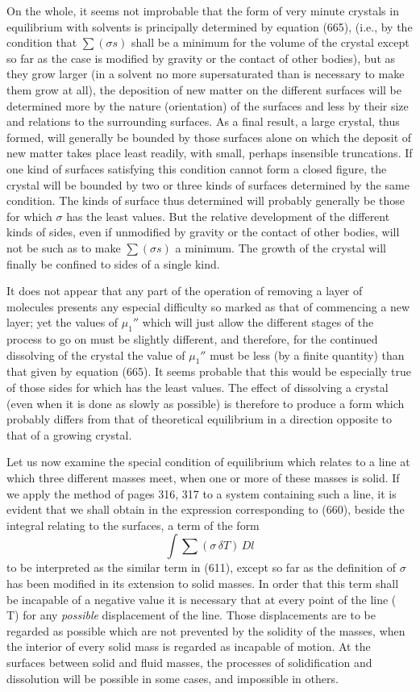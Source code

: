 \documentclass[12pt]{article}
\newcommand{\dd}{\delta}
\begin{document}
{On the whole, it seems not improbable that the form of very minute crystals in equilibrium with solvents is principally determined by equation (665), (i.e., by the condition that $\sum(\sigma s)$ shall be a minimum for the volume of the crystal except so far as the case is modified by gravity or the contact of other bodies), but as they grow larger (in a solvent no more supersaturated than is necessary to make them grow at all), the deposition of new matter on the different surfaces will be determined more by the nature (orientation) of the surfaces and less by their size and relations to the surrounding surfaces.  As a final result, a large crystal, thus formed, will generally be bounded by those surfaces alone on which the deposit of new matter takes place least readily, with small, perhaps insensible truncations. If one kind of surfaces satisfying this condition cannot form a closed figure, the crystal will be bounded by two or three kinds of surfaces determined by the same condition. The kinds of surface thus determined will probably generally be those for which $\sigma$ has the least values. But the relative development of the different kinds of sides, even if unmodified by gravity or the contact of other bodies, will not be such as to make $\sum(\sigma s)$ a minimum. The growth of the crystal will finally be confined to sides of a single kind.\par
It does not appear that any part of the operation of removing a layer of molecules presents any especial difficulty so marked as that of commencing a new layer; yet the values of $\mu_1''$ which will just allow the different stages of the process to go on must be slightly different, and therefore, for the continued dissolving of the crystal the value of $\mu_1''$ must be less (by a finite quantity) than that given by equation (665). It seems probable that this would be especially true of those sides for which  has the least values. The effect of dissolving a crystal (even when it is done as slowly as possible) is therefore to produce a form which probably differs from that of theoretical equilibrium in a direction opposite to that of a growing crystal.}

Let us now examine the special condition of equilibrium which relates to a line at which three different masses meet, when one or more of these masses is solid. If we apply the method of pages 316, 317 to a system containing such a line, it is evident that we shall obtain in the expression corresponding to (660), beside the integral relating to the surfaces, a term of the form
$$ \int \sum(\sigma \, \dd T) \, Dl$$
to be interpreted as the similar term in (611), except so far as the definition of $\sigma$ has been modified in its extension to solid masses. In order that this term shall be incapable of a negative value it is necessary that at every point of the line
\eqs \sum(\sigma \, \dd T)    \label{671} \eqe
for any \textit{possible} displacement of the line. Those displacements are to be regarded as possible which are not prevented by the solidity of the masses, when the interior of every solid mass is regarded as incapable of motion. At the surfaces between solid and fluid masses, the processes of solidification and dissolution will be possible in some cases, and impossible in others.
\end{document}

